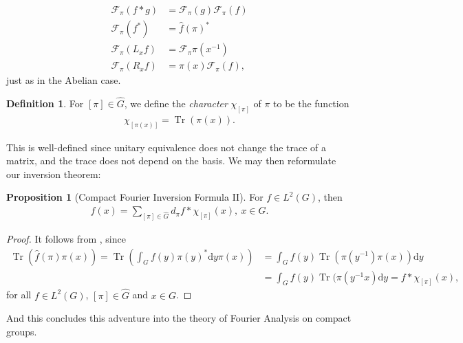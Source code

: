 \documentclass[10pt,twoside,openany,final]{memoir}
\theoremstyle{definition}
\newtheorem{proposition}[theorem]{Proposition}
\newtheorem{definition}[theorem]{Definition}
\theoremstyle{Break}
\newcommand{\F}{\mathcal{F}}
\newcommand{\G}{\widehat{G}}
\renewcommand{\d}{\mathrm{d}}
\DeclareMathOperator{\tr}{Tr}
\begin{document}
\begin{align*}
	\F_\pi(f \ast g)&=\F_\pi(g) \F_\pi(f)\\
	\F_\pi(f^*)&=\widehat{f}(\pi)^*\\
	\F_\pi(L_x f) &= \F_\pi \pi(x^{-1})\\
	\F_\pi(R_x f) &= \pi(x) \F_\pi(f),
\end{align*}
just as in the Abelian case.
\begin{definition}
	For $[\pi] \in \G$, we define the \emph{character} $\chi_{[\pi]}$ of $\pi$ to be the function
	\begin{align*}
		\chi_{[\pi(x)]}=\tr(\pi(x)).
	\end{align*}
	\label{chardef}
\end{definition}
This is well-defined since unitary equivalence does not change the trace of a matrix, and the trace does not depend on the basis. We may then reformulate our inversion theorem:
\begin{proposition}[Compact Fourier Inversion Formula II]
	For $f \in L^2(G)$, then 
	\begin{align*}
		f(x)=\sum_{[\pi]\in\G} d_\pi f \ast \chi_{[\pi]}(x), \ x \in G.
	\end{align*}
\end{proposition}
\begin{proof}
	It follows from , since
	\begin{align*}
		\tr(\widehat{f}(\pi)\pi(x))=\tr\left( \int_G f(y) \pi(y)^* \d y \pi(x) \right)&= \int_{G}f(y) \tr(\pi(y^{-1}) \pi(x) ) \d y\\
		&= \int_G f(y) \tr(\pi(y^{-1}x) \d y = f \ast \chi_{[\pi]}(x),
	\end{align*}
	for all $f \in L^2(G)$, $[\pi] \in \G$ and $x \in G$.
\end{proof}
And this concludes this adventure into the theory of Fourier Analysis on compact groups.
\end{document}
